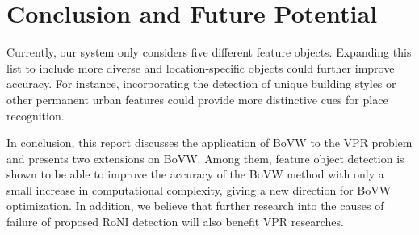 \documentclass[conference]{IEEEtran}
\begin{document}
\section{Conclusion and Future Potential}

Currently, our system only considers five different feature objects. Expanding this list to include more diverse and location-specific objects could further improve accuracy. For instance, incorporating the detection of unique building styles or other permanent urban features could provide more distinctive cues for place recognition.

In conclusion, this report discusses the application of BoVW to the VPR problem and presents two extensions on BoVW. Among them, feature object detection is shown to be able to improve the accuracy of the BoVW method with only a small increase in computational complexity, giving a new direction for BoVW optimization. In addition, we believe that further research into the causes of failure of proposed RoNI detection will also benefit VPR researches.



\end{document}
